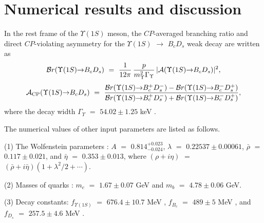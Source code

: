 \documentclass[preprint,superscriptaddress,nofootinbib]{revtex4}
\begin{document}
  \section{Numerical results and discussion}
  \label{sec03}
  In the rest frame of the ${\Upsilon}(1S)$ meson,
  the $CP$-averaged branching ratio and direct $CP$-violating
  asymmetry for the ${\Upsilon}(1S)$ ${\to}$
  $B_{c}D_{s}$ weak decay are written as
   \begin{equation}
  {\cal B}r({\Upsilon}(1S){\to}B_{c}D_{s})\ =\ \frac{1}{12{\pi}}\,
   \frac{p}{m_{{\Upsilon}}^{2}{\Gamma}_{{\Upsilon}}}\,
  {\vert}{\cal A}({\Upsilon}(1S){\to}B_{c}D_{s}){\vert}^{2}
   \label{br},
   \end{equation}
   \begin{equation}
  {\cal A}_{\rm CP}({\Upsilon}(1S){\to}B_{c}D_{s})\ =\
   \frac{{\cal B}r({\Upsilon}(1S){\to}B_{c}^{+}D_{s}^{-})
        -{\cal B}r({\Upsilon}(1S){\to}B_{c}^{-}D_{s}^{+})}
        {{\cal B}r({\Upsilon}(1S){\to}B_{c}^{+}D_{s}^{-})
        +{\cal B}r({\Upsilon}(1S){\to}B_{c}^{-}D_{s}^{+})}
   \label{cp},
   \end{equation}
  where the decay width ${\Gamma}_{\Upsilon}$ $=$
  $54.02{\pm}1.25$ keV \cite{pdg}.

  The numerical values of other input parameters are listed as follows.

  (1) The Wolfenstein parameters \cite{pdg}:
    $A$ $=$ $0.814^{+0.023}_{-0.024}$,
    ${\lambda}$ $=$ $0.22537{\pm}0.00061$,
    $\bar{\rho}$ $=$ $0.117{\pm}0.021$, and
    $\bar{\eta}$ $=$ $0.353{\pm}0.013$, where
    $({\rho}+i{\eta})$ $=$ $(\bar{\rho}+i\bar{\eta})
    (1+{\lambda}^{2}/2+{\cdots})$.

  (2) Masses of quarks \cite{pdg}:
    $m_{c}$ $=$ $1.67{\pm}0.07$ GeV and
    $m_{b}$ $=$ $4.78{\pm}0.06$ GeV.

  (3) Decay constants:
    $f_{{\Upsilon}(1S)}$ $=$ $676.4{\pm}10.7$ MeV \cite{prd92},
    $f_{B_{c}}$ $=$ $489{\pm}5$ MeV \cite{fbc}, and
    $f_{D_{s}}$ $=$ $257.5{\pm}4.6$ MeV \cite{pdg}.
\end{document}

